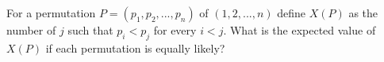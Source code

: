For a permutation $P = (p_1, p_2, ... , p_n)$ of $(1, 2, ... , n)$ define $X(P)$ as the number of $j$ such that $p_i < p_j$ for every $i < j$. What is the expected value of $X(P)$ if each permutation is equally likely?